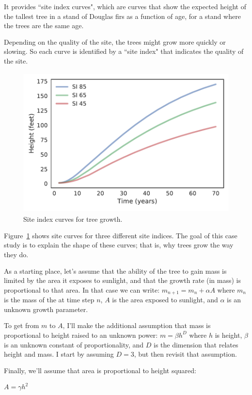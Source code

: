 \documentclass[12pt]{book}
\theoremstyle{exercise}
\begin{document}
It provides ``site index curves", which are curves that show the expected height of the tallest tree in a stand of Douglas firs as a function of age, for a stand where the trees are the same age.

Depending on the quality of the site, the trees might grow more quickly or slowing.  So each curve is identified by a ``site index" that indicates the quality of the site.

\begin{figure}
\centerline{\includegraphics[height=3in]{figs/trees-fig01.pdf}}
\caption{Site index curves for tree growth.}
\label{trees-fig01}
\end{figure}

Figure~\ref{trees-fig01} shows site curves for three different site indices.
The goal of this case study is to explain the shape of these curves; that is, why trees grow the way they do.

As a starting place, let's assume that the ability of the tree to gain mass is limited by the area it exposes to sunlight, and that the growth rate (in mass) is proportional to that area.  In that case we can write:
%
$ m_{n+1} = m_n + \alpha A$
%
where $m_n$ is the mass of the at time step $n$, $A$ is the area exposed to sunlight, and $\alpha$ is an unknown growth parameter.

To get from $m$ to $A$, I'll make the additional assumption that mass is proportional to height raised to an unknown power:
%
$ m = \beta h^D $
%
where $h$ is height, $\beta$ is an unknown constant of proportionality, and $D$ is the dimension that relates height and mass.  I start by assuming $D=3$, but then revisit that assumption.

Finally, we'll assume that area is proportional to height squared:

$ A = \gamma h^2$
\end{document}
